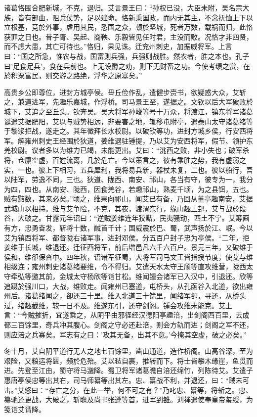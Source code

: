 \documentclass[12pt,UTF8]{ctexbook}
\begin{document}
诸葛恪围合肥新城，不克，退归。艾言景王曰：“孙权已没，大臣未附，吴名宗大族，皆有部曲，阻兵仗势，足以建命。恪新秉国政，而内无其主，不念抚恤上下以立根基，竞於外事，虐用其民，悉国之众，顿於坚城，死者万数，载祸而归，此恪获罪之日也。昔子胥、吴起、商鞅、乐毅皆见任时君，主没而败。况恪才非四贤，而不虑大患，其亡可待也。”恪归，果见诛。迁兖州刺史，加振威将军。上言曰：“国之所急，惟农与战，国富则兵强，兵强则战胜。然农者，胜之本也。孔子曰'足食足兵'，食在兵前也。上无设爵之劝，则下无财畜之功。今使考绩之赏，在於积粟富民，则交游之路绝，浮华之原塞矣。”

高贵乡公即尊位，进封方城亭侯。毌丘俭作乱，遣健步赍书，欲疑惑大众，艾斩之，兼道进军，先趣乐嘉城，作浮桥。司马景王至，遂据之。文钦以后大军破败於城下，艾追之至丘头。钦奔吴。吴大将军孙峻等号十万众，将渡江，镇东将军诸葛诞遣艾据肥阳，艾以与贼势相远，非要害之地，辄移屯附亭，遣泰山太守诸葛绪等于黎浆拒战，遂走之。其年徵拜长水校尉。以破钦等功，进封方城乡侯，行安西将军。解雍州刺史王经围於狄道，姜维退驻锺提，乃以艾为安西将军，假节、领护东羌校尉。议者多以为维力已竭，未能更出。艾曰：“洮西之败，非小失也；破军杀将，仓廪空虚，百姓流离，几於危亡。今以策言之，彼有乘胜之势，我有虚弱之实，一也。彼上下相习，五兵犀利，我将易兵新，器杖未复，二也。彼以船行，吾以陆军，劳逸不同，三也。狄道、陇西、南安、祁山，各当有守，彼专为一，我分为四，四也。从南安、陇西，因食羌谷，若趣祁山，熟麦千顷，为之县饵，五也。贼有黠数，其来必矣。”顷之，维果向祁山，闻艾已有备，乃回从董亭趣南安，艾据武城山以相持。维与艾争险，不克，其夜，渡渭东行，缘山趣上邽，艾与战於段谷，大破之。甘露元年诏曰：“逆贼姜维连年狡黠，民夷骚动，西土不宁。艾筹画有方，忠勇奋发，斩将十数，馘首千计；国威震於巴、蜀，武声扬於江、岷。今以艾为镇西将军、都督陇右诸军事，进封邓侯。分五百户封子忠为亭侯。“二年，拒姜维于长城，维退还。迁征西将军，前后增邑凡六千六百户。景元三年，又破维于侯和，维卻保沓中。四年秋，诏诸军征蜀，大将军司马文王皆指授节度，使艾与维相缀连；雍州刺史诸葛绪要维，令不得归。艾遣天水太守王颀等直攻维营，陇西太守牵弘等邀其前，金城太守杨欣等诣甘松。维闻锺会诸军已入汉中，引退还。欣等追蹑於强川口，大战，维败走。闻雍州已塞道，屯桥头，从孔函谷入北道，欲出雍州后。诸葛绪闻之，卻还三十里。维入北道三十馀里，闻绪军卻，寻还，从桥头过，绪趣截维，较一日不及。维遂东引，还守剑阁。锺会攻维未能克。艾上言：“今贼摧折，宜遂乘之，从阴平由邪径经汉德阳亭趣涪，出剑阁西百里，去成都三百馀里，奇兵冲其腹心。剑阁之守必还赴涪，则会方轨而进；剑阁之军不还，则应涪之兵寡矣。军志有之曰：'攻其无备，出其不意。'今掩其空虚，破之必矣。”

冬十月，艾自阴平道行无人之地七百馀里，凿山通道，造作桥阁。山高谷深，至为艰险，又粮运将匮，频於危殆。艾以毡自裹，推转而下。将士皆攀木缘崖，鱼贯而进。先登至江由，蜀守将马邈降。蜀卫将军诸葛瞻自涪还绵竹，列陈待艾。艾遣子惠唐亭侯忠等出其右，司马师纂等出其左。忠、纂战不利，并退还，曰：“贼未可击。”艾怒曰：“存亡之分，在此一举，何不可之有？”乃叱忠、纂等，将斩之。忠、纂驰还更战，大破之，斩瞻及尚书张遵等首，进军到雒。刘禅遣使奉皇帝玺绶，为笺诣艾请降。
\end{document}

